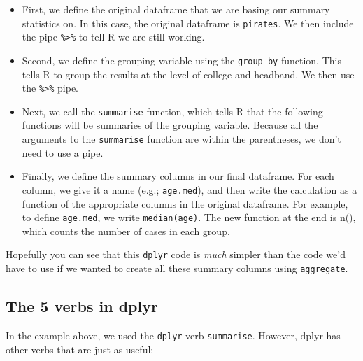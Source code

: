 \documentclass{tufte-book}\usepackage[]{graphicx}\usepackage[]{color}
\begin{document}
\begin{itemize}
  \item First, we define the original dataframe that we are basing our summary statistics on. In this case, the original dataframe is \texttt{pirates}. We then include the pipe \texttt{\%>\%} to tell R we are still working.
  \item Second, we define the grouping variable using the \texttt{group\_by} function. This tells R to group the results at the level of college and headband. We then use the \texttt{\%>\%} pipe.
  \item Next, we call the \texttt{summarise} function, which tells R that the following functions will be summaries of the grouping variable. Because all the arguments to the \texttt{summarise} function are within the parentheses, we don't need to use a pipe.
  \item Finally, we define the summary columns in our final dataframe. For each column, we give it a name (e.g.; \texttt{age.med}), and then write the calculation as a function of the appropriate columns in the original dataframe. For example, to define \texttt{age.med}, we write \texttt{median(age)}. The new function at the end is n(), which counts the number of cases in each group.

\end{itemize}

Hopefully you can see that this \texttt{dplyr} code is \textit{much} simpler than the code we'd have to use if we wanted to create all these summary columns using \texttt{aggregate}.

\subsection{The 5 verbs in dplyr}

In the example above, we used the \texttt{dplyr} verb \texttt{summarise}. However, dplyr has other verbs that are just as useful:
\end{document}
